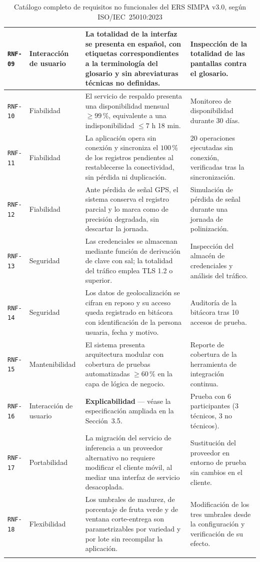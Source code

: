 \documentclass[11pt,a4paper]{article}
\newcommand{\id}[1]{\texttt{#1}}
\begin{document}
\begin{longtable}{|C{1.3cm}|L{2.3cm}|L{6.2cm}|L{3.4cm}|}
\id{RNF-09} & Interacción de usuario & La totalidad de la interfaz se presenta en español, con
etiquetas correspondientes a la terminología del glosario y sin abreviaturas técnicas no
definidas. & Inspección de la totalidad de las pantallas contra el glosario. \\ \hline
\id{RNF-10} & Fiabilidad & El servicio de respaldo presenta una disponibilidad mensual $\geq 99\,\%$,
equivalente a una indisponibilidad $\leq 7$ h 18 min. & Monitoreo de disponibilidad durante 30
días. \\ \hline
\id{RNF-11} & Fiabilidad & La aplicación opera sin conexión y sincroniza el $100\,\%$ de los
registros pendientes al restablecerse la conectividad, sin pérdida ni duplicación. & 20 operaciones
ejecutadas sin conexión, verificadas tras la sincronización. \\ \hline
\id{RNF-12} & Fiabilidad & Ante pérdida de señal GPS, el sistema conserva el registro parcial y lo
marca como de precisión degradada, sin descartar la jornada. & Simulación de pérdida de señal
durante una jornada de polinización. \\ \hline
\id{RNF-13} & Seguridad & Las credenciales se almacenan mediante función de derivación de clave con
sal; la totalidad del tráfico emplea TLS 1.2 o superior. & Inspección del almacén de credenciales y
análisis del tráfico. \\ \hline
\id{RNF-14} & Seguridad & Los datos de geolocalización se cifran en reposo y su acceso queda
registrado en bitácora con identificación de la persona usuaria, fecha y motivo. & Auditoría de la
bitácora tras 10 accesos de prueba. \\ \hline
\id{RNF-15} & Mantenibilidad & El sistema presenta arquitectura modular con cobertura de pruebas
automatizadas $\geq 60\,\%$ en la capa de lógica de negocio. & Reporte de cobertura de la
herramienta de integración continua. \\ \hline
{}\id{RNF-16} & Interacción de usuario & \textbf{Explicabilidad} --- véase la
especificación ampliada en la Sección~3.5. & Prueba con 6 participantes (3 técnicos, 3 no
técnicos). \\ \hline
\id{RNF-17} & Portabilidad & La migración del servicio de inferencia a un proveedor alternativo no
requiere modificar el cliente móvil, al mediar una interfaz de servicio desacoplada. &
Sustitución del proveedor en entorno de prueba sin cambios en el cliente. \\ \hline
\id{RNF-18} & Flexibilidad & Los umbrales de madurez, de porcentaje de fruta verde y de ventana
corte-entrega son parametrizables por variedad y por lote sin recompilar la aplicación. &
Modificación de los tres umbrales desde la configuración y verificación de su efecto. \\ \hline
\caption{Catálogo completo de requisitos no funcionales del ERS SIMPA v3.0, según ISO/IEC~25010:2023}
\label{tab:catalogo-rnf}
\end{longtable}
\end{document}
